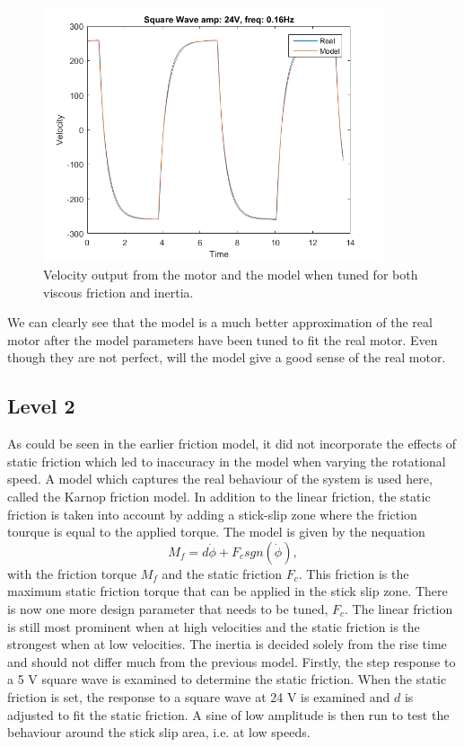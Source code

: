 \documentclass[12pt,a4paper]{article}
\begin{document}
\begin{figure}[H]
    \centering
    \includegraphics[width=100mm]{l1_sq_a24_f016.png}
    \caption{Velocity output from the motor and the model when tuned for
    both viscous friction and inertia.}
    \label{fig:l1_sq_a24_f016}
\end{figure}

We can clearly see that the model is a much better approximation of the
real motor after the model parameters have been tuned to fit the
real motor. Even though they are not perfect, will the model give a good
sense of the real motor.
\subsection*{Level 2}
\label{sub:level_2}
As could be seen in the earlier friction model, it did not incorporate the
effects of static friction which led to inaccuracy in the model when varying the
rotational speed. A model which captures the real behaviour of the system is
used here, called the Karnop friction model. In addition to the linear friction,
the static friction is taken into account by adding a stick-slip zone where the
friction tourque is equal to the applied torque. The model is given by the
nequation
\begin{equation}
    \label{eq:karnop}
    M_f = d \dot{\phi} + F_c sgn(\dot{\phi}),
\end{equation}
with the friction torque $M_f$ and the static friction $F_c$. This
friction is the maximum static friction torque that can be applied in
the stick slip zone.  There is now one more design parameter that needs
to be tuned, $F_c$.  The linear friction is still most prominent when at
high velocities and the static friction is the strongest when at low
velocities. The inertia is decided solely from the rise time and should
not differ much from the previous model.  Firstly, the step response to
a 5 V square wave is examined to determine the static friction. When the
static friction is set, the response to a square wave at 24 V is
examined and $d$ is adjusted to fit the static friction. A sine of low
amplitude is then run to test the behaviour around the stick slip area,
i.e.  at low speeds.\\
\end{document}
